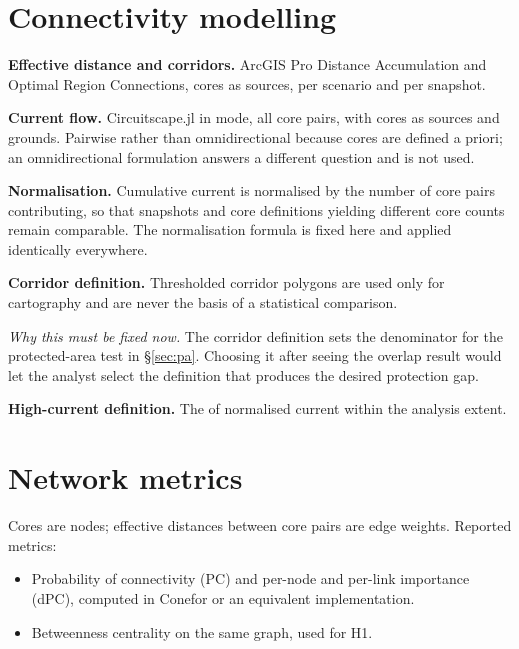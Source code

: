\section{Connectivity modelling}

\textbf{Effective distance and corridors.} ArcGIS Pro Distance Accumulation and
Optimal Region Connections, cores as sources, per scenario and per snapshot.

\textbf{Current flow.} Circuitscape.jl in  mode, all core pairs,
with cores as sources and grounds. Pairwise rather than omnidirectional because
cores are defined a priori; an omnidirectional formulation answers a different
question and is not used.

\textbf{Normalisation.} Cumulative current is normalised by the number of core
pairs contributing, so that snapshots and core definitions yielding different
core counts remain comparable. The normalisation formula is fixed here and
applied identically everywhere.

\textbf{Corridor definition.}  Thresholded corridor polygons are used only for cartography and are
never the basis of a statistical comparison.

\emph{Why this must be fixed now.} The corridor definition sets the denominator
for the protected-area test in \S\ref{sec:pa}. Choosing it after seeing the
overlap result would let the analyst select the definition that produces the
desired protection gap.

\textbf{High-current definition.} The  of normalised current
within the analysis extent.

\section{Network metrics}

Cores are nodes; effective distances between core pairs are edge weights.
Reported metrics:

\begin{itemize}[leftmargin=*,nosep]
\item Probability of connectivity (PC) and per-node and per-link importance
(dPC), computed in Conefor or an equivalent implementation.
\item Betweenness centrality on the same graph, used for H1.
\end{itemize}

